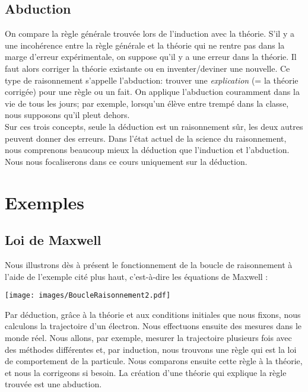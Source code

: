 \subsection{Abduction}

On compare la règle générale trouvée lors de l'induction avec la théorie.
S'il y a une incohérence entre la règle générale et la théorie qui ne rentre pas dans la marge d'erreur expérimentale, on suppose qu'il y a une erreur dans la théorie.
Il faut alors corriger la théorie existante ou en inventer/deviner une nouvelle. 
Ce type de raisonnement s'appelle l'abduction:
trouver une {\em explication} (= la théorie corrigée) pour une règle ou un fait.
On applique l'abduction couramment dans la vie de tous les jours; par exemple, lorsqu'un élève entre trempé dans la classe, nous supposons qu'il pleut dehors. \\


Sur ces trois concepts, seule la déduction est un raisonnement sûr, les deux autres peuvent donner
des erreurs.
Dans l'état actuel de la science du raisonnement, nous comprenons beaucoup mieux la déduction
que l'induction et l'abduction.
Nous nous focaliserons dans ce cours uniquement sur la déduction. \\


\section{Exemples}

\subsection{Loi de Maxwell}

Nous illustrons dès à présent le fonctionnement de la boucle de raisonnement à l'aide de l'exemple cité plus haut, c'est-à-dire les équations de Maxwell :

\begin{center}
\texttt{[image: images/BoucleRaisonnement2.pdf]}
\end{center}

Par déduction, grâce à la théorie et aux conditions initiales que nous fixons, nous calculons
la trajectoire d'un électron. Nous effectuons ensuite des mesures dans le monde réel. Nous allons, par exemple, mesurer la trajectoire plusieurs fois avec des méthodes différentes et, par induction, nous trouvons une règle qui est la loi de comportement de la particule.
Nous comparons ensuite cette règle à la théorie, et nous la corrigeons si besoin.
La création d'une théorie qui explique la règle trouvée est une abduction.
\\



